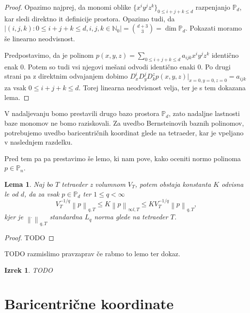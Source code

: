 \documentclass[11pt,a4paper]{article}
\newtheorem{lemma}{Lema}
\newtheorem{theorem}{Izrek}
\begin{document}
\begin{proof}
    Opazimo najprej, da monomi oblike $\{x^i y^j z^k\}_{0 \le i  + j + k \le d}$
    razpenjanjo $\mathbb{P}_d$, kar sledi direktno it definicije 
    prostora. Opazimo tudi, da 
    $|\left(i, j , k\right): 0\le i+j+k \le d , i,j,k \in \mathbb{N}_0| = \binom{d+3}{3} = \dim\mathbb{P}_d$.
    Pokazati moramo še linearno neodvisnost.  

    Predpostavimo, da je polinom $p(x,y,z) =\sum_{0 \le i  + j + k \le d} a_{ijk} x^i y^j z^k $
    identično enak 0. Potem so tudi vsi njegovi mešani odvodi identično enaki 0.
    Po drugi strani pa z direktnim odvajanjem dobimo
    $D^i_xD^j_yD^z_k p(x,y,z)|_{x =0 ,y =0, z = 0} = a_{ijk}$ za vsak 
    $0 \le i  + j + k \le d$. Torej linearna neodvisnost velja, ter
    je s tem dokazana lema.
\end{proof}

V nadaljevanju bomo prestavili drugo bazo prostora $\mathbb{P}_d$, zato 
nadaljne lastnosti baze monomov ne bomo raziskovali. Za uvedbo Bernsteinovih
baznih polinomov, potrebujemo uvedbo baricentričnih koordinat glede na 
tetraeder, kar je vpeljano v naslednjem razdelku.

Pred tem pa pa prestavimo še lemo, ki nam pove, kako oceniti 
normo polinoma $p \in \mathbb{P}_n$.

\begin{lemma}\label{lema_norma}
    Naj bo $T$ tetraeder z volumnom $V_T$, potem obstaja 
    konstanta $K$ odvisna le od $d$, da za vsak  $p \in \mathbb{P}_d$ ter $1 \le q < \infty$
    \begin{equation}
        V_T^{-1/q} \left\lVert p \right\rVert_{q,T} \le K \left\lVert p \right\rVert_{\infty l, T} \le K V_T^{-1/q} \left\lVert p \right\rVert_{q,T},
    \end{equation}
    kjer je $\left\lVert \dot{} \right\rVert_{q,T}$ standardna $L_q$ norma 
    glede na tetraeder $T$.
\end{lemma}

\begin{proof}
    TODO
\end{proof}

TODO razmislimo pravzaprav če rabmo to lemo ter dokaz.

\begin{theorem}
    TODO
\end{theorem}

\section{Baricentrične koordinate}
\end{document}
